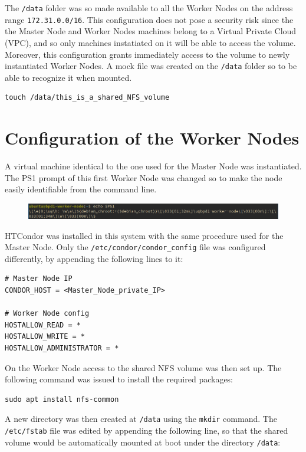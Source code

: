 \documentclass{article}
\begin{document}
The \texttt{/data} folder was so made available to all the Worker Nodes on the address range \texttt{172.31.0.0/16}.
This configuration does not pose a security risk since the the Master Node and Worker Nodes machines belong to a Virtual Private Cloud (VPC), and so only machines instatiated on it will be able to access the volume.
Moreover, this configuration grants immediately access to the volume to newly instantiated Worker Nodes.
A mock file was created on the \texttt{/data} folder so to be able to recognize it when mounted.

\begin{lstlisting}
touch /data/this_is_a_shared_NFS_volume
\end{lstlisting}

\section{Configuration of the Worker Nodes}
A virtual machine identical to the one used for the Master Node was instantiated.
The PS1 prompt of this first Worker Node was changed so to make the node easily identifiable from the command line.

\begin{figure}[!h]
	\center
	\includegraphics[width=\textwidth]{./images/worker-ps1.png}
\end{figure}

HTCondor was installed in this system with the same procedure used for the Master Node.
Only the \texttt{/etc/condor/condor\_config} file was configured differently, by appending the following lines to it:

\begin{lstlisting}
# Master Node IP
CONDOR_HOST = <Master_Node_private_IP>

# Worker Node config
HOSTALLOW_READ = *
HOSTALLOW_WRITE = *
HOSTALLOW_ADMINISTRATOR = *
\end{lstlisting}

On the Worker Node access to the shared NFS volume was then set up.
The following command was issued to install the required packages:

\begin{lstlisting}
sudo apt install nfs-common
\end{lstlisting}

A new directory was then created at \texttt{/data} using the \texttt{mkdir} command.
The \texttt{/etc/fstab} file was edited by appending the following line, so that the shared volume would be automatically mounted at boot under the directory \texttt{/data}:
\end{document}
